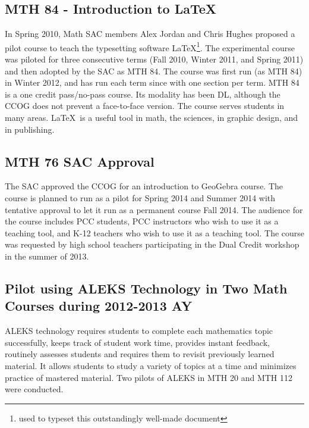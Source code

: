 \subsection{MTH 84 - Introduction to \LaTeX}
In Spring 2010, Math SAC members Alex Jordan and Chris Hughes proposed a pilot
course to teach the typesetting software \LaTeX\footnote{used to typeset this
outstandingly well-made document}.  The experimental course was piloted for
three consecutive terms (Fall 2010, Winter 2011, and Spring 2011) and then
adopted by the SAC as MTH 84.  The course was first run (as MTH 84) in Winter
2012, and has run each term since with one section per term. MTH 84 is a one
credit pass/no-pass course. Its modality has been DL, although the CCOG does not
prevent a face-to-face version.  The course serves students in many areas.
\LaTeX\ is a useful tool in math, the sciences, in graphic design, and in
publishing. 
 
\subsection{MTH 76 SAC Approval}
The SAC approved the CCOG for an introduction to GeoGebra course. The course is
planned to run as a pilot for Spring 2014 and Summer 2014 with tentative
approval to let it run as a permanent course Fall 2014.  The audience for the
course includes PCC students, PCC instructors who wish to use it as a teaching
tool, and K-12 teachers who wish to use it as a teaching tool.  The course was
requested by high school teachers participating in the Dual Credit workshop in
the summer of 2013.

\subsection[ALEKS pilot]{Pilot using ALEKS Technology in Two Math Courses during 2012-2013 AY}\label{sec3:subset:alekspilot}
ALEKS technology requires students to complete each mathematics topic
successfully, keeps track of student work time, provides instant feedback,
routinely assesses students and requires them to revisit previously learned
material.  It allows students to study a variety of topics at a time and
minimizes practice of mastered material. Two pilots of ALEKS in MTH 20 and MTH
112 were conducted.

